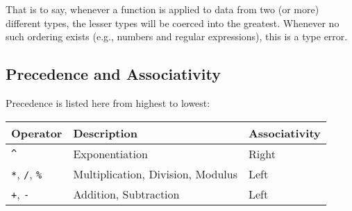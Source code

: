 That is to say, whenever a function is applied to data from two (or
more) different types, the lesser types will be coerced into the
greatest. Whenever no such ordering exists (e.g., numbers and regular
expressions), this is a type error.


\subsection{Precedence and Associativity}

Precedence is listed here from highest to lowest:

\begin{center}\begin{tabular}{lll}
  Operator                            & Description                       & Associativity \\ \hline
  \texttt{\^}                         & Exponentiation                    & Right \\
  \texttt{*}, \texttt{/}, \texttt{\%} & Multiplication, Division, Modulus & Left \\
  \texttt{+}, \texttt{-}              & Addition, Subtraction             & Left
\end{tabular}\end{center}
